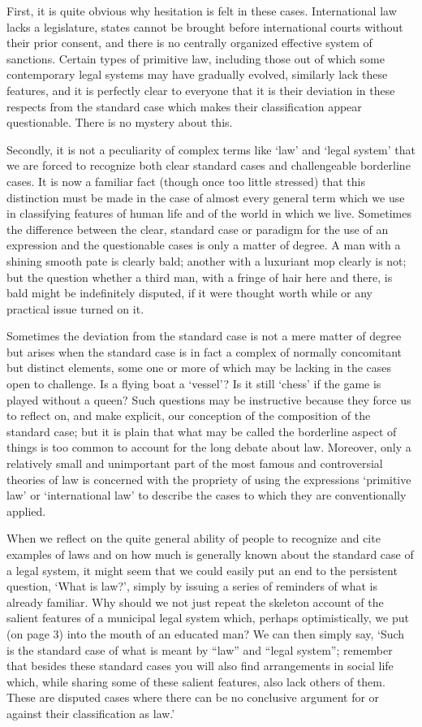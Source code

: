 \documentclass[12pt,oneside]{book}  %
\begin{document}
First, it is quite obvious why hesitation is felt in these cases.
International law lacks a legislature, states cannot be brought before
international courts without their prior consent, and there is no
centrally organized effective system of sanctions. Certain types of
primitive law, including those out of which some contemporary legal
systems may have gradually evolved, similarly lack these features, and
it is perfectly clear to everyone that it is their deviation in these
respects from the standard case which makes their classification appear
questionable. There is no mystery about this.

Secondly, it is not a peculiarity of complex terms like `law' and `legal
system' that we are forced to recognize both clear standard cases and
challengeable borderline cases. It is now a familiar fact (though once
too little stressed) that this distinction must be made in the case of
almost every general term which we use in classifying features of human
life and of the world in which we live. Sometimes the difference between
the clear, standard case or paradigm for the use of an expression and
the questionable cases is only a matter of degree. A man with a shining
smooth pate is clearly bald; another with a luxuriant mop clearly is
not; but the question whether a third man, with a fringe of hair here
and there, is bald might be indefinitely disputed, if it were thought
worth while or any practical issue turned on it.

Sometimes the deviation from the standard case is not a mere matter of
degree but arises when the standard case is in fact a complex of
normally concomitant but distinct elements, some one or more of which
may be lacking in the cases open to challenge. Is a flying boat a
`vessel'? Is it still `chess' if the game is played without a queen?
Such questions may be instructive because they force us to reflect on,
and make explicit, our conception of the composition of the standard
case; but it is plain that what may be called the borderline aspect of
things is too common to account for the long debate about law. Moreover,
only a relatively small and unimportant part of the most famous and
controversial theories of law is concerned with the propriety of using
the expressions `primitive law' or `international law' to describe the
cases to which they are conventionally applied.

When we reflect on the quite general ability of people to recognize and
cite examples of laws and on how much is generally known about the
standard case of a legal system, it might seem that we could easily put
an end to the persistent question, `What is law?', simply by issuing a
series of reminders of what is already familiar. Why should we not just
repeat the skeleton account of the salient features of a municipal legal
system which, perhaps optimistically, we put (on page 3) into the mouth
of an educated man? We can then simply say, `Such is the standard case
of what is meant by ``law'' and ``legal system''; remember that besides
these standard cases you will also find arrangements in social life
which, while sharing some of these salient features, also lack others of
them. These are disputed cases where there can be no conclusive argument
for or against their classification as law.'
\end{document}

